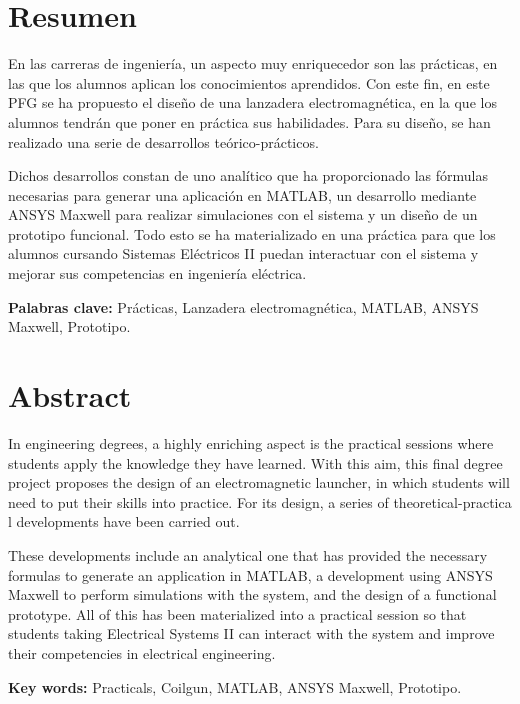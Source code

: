 \section*{Resumen}

En las carreras de ingeniería, un aspecto muy enriquecedor son las prácticas, en las que los alumnos aplican los conocimientos aprendidos. Con este fin, en este PFG se ha propuesto el diseño de una lanzadera electromagnética, en la que los alumnos tendrán que poner en práctica sus habilidades. Para su diseño, se han realizado una serie de desarrollos teórico-prácticos.

Dichos desarrollos constan de uno analítico que ha proporcionado las fórmulas necesarias para generar una aplicación en MATLAB, un desarrollo mediante ANSYS Maxwell para realizar simulaciones con el sistema y un diseño de un prototipo funcional. Todo esto se ha materializado en una práctica para que los alumnos cursando Sistemas Eléctricos II puedan interactuar con el sistema y mejorar sus competencias en ingeniería eléctrica.

\vspace{0.5cm}
\textbf{Palabras clave:} Prácticas, Lanzadera electromagnética, MATLAB\textsuperscript{\textregistered}, ANSYS Maxwell, Prototipo.

\newpage
\thispagestyle{plain}
\section*{Abstract}
In engineering degrees, a highly enriching aspect is the practical sessions where students apply the knowledge they have learned. With this aim, this final degree project proposes the design of an electromagnetic launcher, in which students will need to put their skills into practice. For its design, a series of theoretical-practica l developments have been carried out.

These developments include an analytical one that has provided the necessary formulas to generate an application in MATLAB\textsuperscript{\textregistered}, a development using ANSYS Maxwell to perform simulations with the system, and the design of a functional prototype. All of this has been materialized into a practical session so that students taking Electrical Systems II can interact with the system and improve their competencies in electrical engineering.

\vspace{0.5cm}
\textbf{Key words:} Practicals, Coilgun,  MATLAB\textsuperscript{\textregistered}, ANSYS Maxwell, Prototipo.